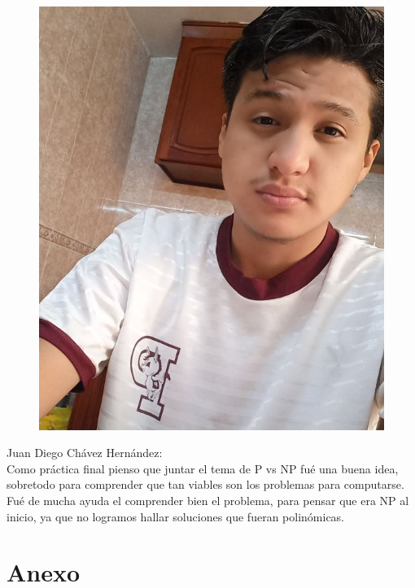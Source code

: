 \documentclass{article}
\begin{document}
    
    \begin{figure}
        \centering
        \includegraphics[scale=0.2]{diego.jpg}
    \end{figure}
    Juan Diego Chávez Hernández:\\
    Como práctica final pienso que juntar el tema de P vs NP fué una buena idea, sobretodo para comprender que tan viables son los problemas para computarse. Fué de mucha ayuda el comprender bien el problema, para pensar que era NP al inicio, ya que no logramos hallar soluciones que fueran polinómicas.\\
    
    \newpage
\section{Anexo}
\end{document}
